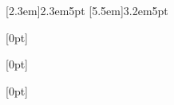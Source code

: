 

\usepackage{booktabs}
\usepackage{titletoc}%

\contentsmargin{0pt}
\renewcommand\contentspage{\thecontentspage}

[2.3em]{}{2.3em}{5pt}
[5.5em]{}{3.2em}{5pt}


  [0pt]%
  {}%
  {\bfseries\chaptername\ \thecontentslabel\quad}%
  {}%
  {\bfseries\dotfill\contentspage\\\vspace{0mm}}%

  [0pt]%
  {}%
  {\bfseries\ \thecontentslabel\quad}%
  {}%
  {\bfseries\dotfill\contentspage\\\vspace{0mm}}%
  
  [0pt]%
  {}%
  {\hspace{2mm}\bfseries\ \thecontentslabel\quad}%
  {}%
  {\bfseries\dotfill\contentspage\\\vspace{0mm}}%

\newcommand*{\noaddvspace}{\renewcommand*{\addvspace}[1]{}}
\addtocontents{lof}{\protect\noaddvspace}
\addtocontents{lot}{\protect\noaddvspace}

\usepackage[utf8]{inputenc}
\usepackage{arabtex}

\usepackage{xeCJK}

\usepackage{mfirstuc}

\usepackage{mathptmx}

\usepackage{graphicx}
\graphicspath{ {Images/} }
\usepackage{caption}
\usepackage{subcaption}

\usepackage[a4paper,top=2.54cm,bottom=2.54cm, left=3cm, right=3cm]{geometry}


